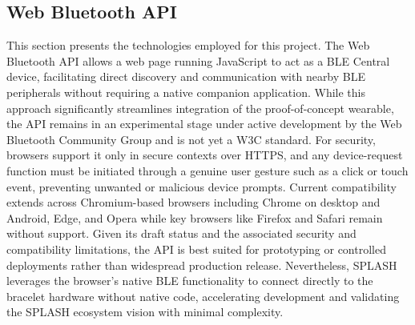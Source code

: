 \subsection{Web Bluetooth API}
This section presents the technologies employed for this project. The Web Bluetooth API allows a web page running JavaScript to act as a \ac{BLE} Central device, facilitating direct discovery and communication with nearby \ac{BLE} peripherals without requiring a native companion application. While this approach significantly streamlines integration of the proof-of-concept wearable, the API remains in an experimental stage under active development by the Web Bluetooth Community Group and is not yet a W3C standard. For security, browsers support it only in secure contexts over HTTPS, and any device-request function must be initiated through a genuine user gesture such as a click or touch event, preventing unwanted or malicious device prompts. Current compatibility extends across Chromium-based browsers including Chrome on desktop and Android, Edge, and Opera while key browsers like Firefox and Safari remain without support. Given its draft status and the associated security and compatibility limitations, the API is best suited for prototyping or controlled deployments rather than widespread production release. Nevertheless, SPLASH leverages the browser’s native \ac{BLE} functionality to connect directly to the bracelet hardware without native code, accelerating development and validating the SPLASH ecosystem vision with minimal complexity\cite{webble_1,webble_2}.

